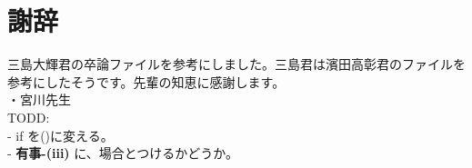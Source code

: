 \documentclass[main.tex]{subfiles}
\begin{document}
\section*{謝辞}
三島大輝君の卒論ファイルを参考にしました。三島君は濱田高彰君のファイルを参考にしたそうです。先輩の知恵に感謝します。\\

・宮川先生\\

TODD:\\
- if を()に変える。\\
- \textbf{有事-(iii)} に、場合とつけるかどうか。\\
\end{document}
